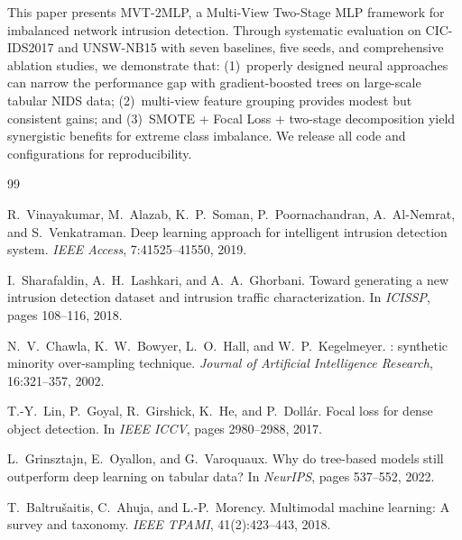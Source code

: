 \documentclass[12pt]{article}
\begin{document}
This paper presents MVT-2MLP, a Multi-View Two-Stage MLP framework for imbalanced network intrusion detection. Through systematic evaluation on CIC-IDS2017 and UNSW-NB15 with seven baselines, five seeds, and comprehensive ablation studies, we demonstrate that: (1)~properly designed neural approaches can narrow the performance gap with gradient-boosted trees on large-scale tabular NIDS data; (2)~multi-view feature grouping provides modest but consistent gains; and (3)~SMOTE + Focal Loss + two-stage decomposition yield synergistic benefits for extreme class imbalance. We release all code and configurations for reproducibility.


\begin{thebibliography}{99}

R.~Vinayakumar, M.~Alazab, K.~P.~Soman, P.~Poornachandran, A.~Al-Nemrat, and S.~Venkatraman.
\newblock Deep learning approach for intelligent intrusion detection system.
\newblock \emph{IEEE Access}, 7:41525--41550, 2019.

I.~Sharafaldin, A.~H.~Lashkari, and A.~A.~Ghorbani.
\newblock Toward generating a new intrusion detection dataset and intrusion traffic characterization.
\newblock In \emph{ICISSP}, pages 108--116, 2018.

N.~V.~Chawla, K.~W.~Bowyer, L.~O.~Hall, and W.~P.~Kegelmeyer.
: synthetic minority over-sampling technique.
\newblock \emph{Journal of Artificial Intelligence Research}, 16:321--357, 2002.

T.-Y.~Lin, P.~Goyal, R.~Girshick, K.~He, and P.~Doll{\'a}r.
\newblock Focal loss for dense object detection.
\newblock In \emph{IEEE ICCV}, pages 2980--2988, 2017.

L.~Grinsztajn, E.~Oyallon, and G.~Varoquaux.
\newblock Why do tree-based models still outperform deep learning on tabular data?
\newblock In \emph{NeurIPS}, pages 537--552, 2022.

T.~Baltru{\v{s}}aitis, C.~Ahuja, and L.-P.~Morency.
\newblock Multimodal machine learning: A survey and taxonomy.
\newblock \emph{IEEE TPAMI}, 41(2):423--443, 2018.

\end{thebibliography}
\end{document}
